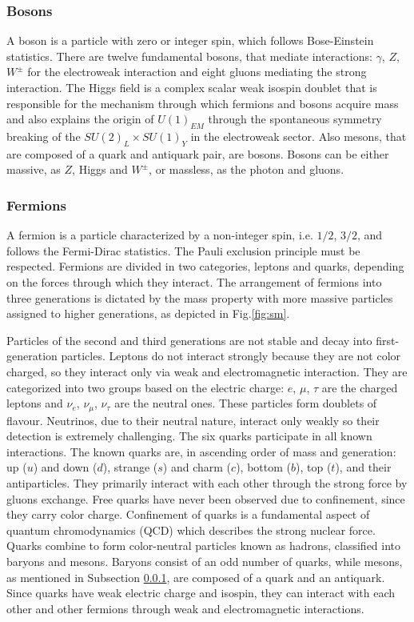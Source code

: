 \subsubsection{Bosons}\label{bosons}
A boson is a particle with zero or integer spin, which follows Bose-Einstein statistics.
There are twelve fundamental bosons, that mediate interactions: $\gamma$, $Z$, $W^{\pm}$
for the electroweak interaction and eight gluons mediating the strong interaction.
The Higgs field is a complex scalar weak isospin doublet that is 
responsible for the mechanism through which fermions and
bosons acquire mass and also explains the origin of $U (1)_{EM}$ 
through the spontaneous
symmetry breaking of the $SU (2)_L \times SU (1)_Y$ in the 
electroweak sector. Also mesons, that are composed of a quark 
and antiquark pair, are bosons. Bosons can be either massive, as $Z$, 
Higgs and $W^{\pm}$, or massless, as the photon and gluons.

\subsubsection{Fermions}
A fermion is a particle characterized by a non-integer spin, i.e. $1/2$, $3/2$, and follows the Fermi-Dirac statistics. 
The Pauli exclusion principle must be respected. Fermions are divided in two categories, leptons and quarks, depending 
on the forces through which they interact.  The arrangement of fermions into three generations is dictated by the mass property 
with more massive particles assigned to higher generations, as 
depicted in Fig.\ref{fig:sm}.

Particles of the second and third generations are not stable and decay into first-generation 
particles. Leptons do not interact strongly because they are not color charged, so they interact only via 
weak and electromagnetic interaction. They are categorized into 
two groups based on the electric charge: $e$, $\mu$, $\tau$ 
are the charged leptons and $\nu_e$, $\nu_{\mu}$, $\nu_{\tau}$ 
are the neutral ones. These particles form doublets of flavour. 
Neutrinos, due to their neutral nature, interact only weakly so 
their detection is extremely challenging. The six quarks 
participate in all known interactions. The known quarks are, 
in ascending order of mass and generation: up ($u$) and down 
($d$), strange ($s$) and charm ($c$), bottom ($b$), top ($t$), 
and their antiparticles. They primarily interact with each 
other through the strong force by gluons exchange. Free quarks 
have never been observed due to confinement, since they carry 
color charge. Confinement of quarks is a fundamental aspect of 
quantum chromodynamics (QCD) which describes the 
strong nuclear force. Quarks combine to form color-neutral 
particles known as hadrons, classified into baryons and mesons. 
Baryons consist of an odd number of quarks, while mesons, 
as mentioned in Subsection \ref{bosons}, are composed of a quark 
and an antiquark. Since quarks have weak electric charge and 
isospin, they can interact with each other and other fermions 
through weak and electromagnetic interactions.

